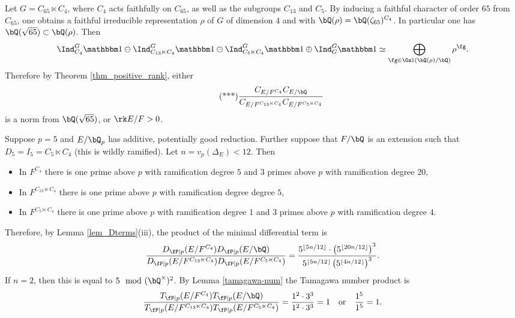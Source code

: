 \begin{example}
Let $G = C_{65} \ltimes C_4$, where $C_4$ acts faithfully on $C_{65}$, as well as the subgroups $C_{13}$ and $C_5$. By inducing a faithful character of order $65$ from $C_{65}$, one obtains a faithful irreducible representation $\rho$ of $G$ of dimension $4$ and with $\bQ(\rho) = \bQ(\zeta_{65})^{C_4}$. In particular one has $\bQ(\sqrt{65}) \subset \bQ(\rho)$. Then
\[ \Ind_{C_4}^G \trivial \ominus \Ind_{C_{13} \ltimes C_4}^G \trivial \ominus \Ind_{C_5 \ltimes C_4}^G \trivial \oplus \Ind_{G}^G \trivial \simeq \bigoplus_{\fg \in \Gal(\bQ(\rho) / \bQ)} \rho^{\fg} .\]
Therefore by Theorem \ref{thm_positive_rank}, either 
\begin{equation}\label{ex3}\tag{***}
\frac{C_{E / F^{C_4}} C_{E / \bQ} }{C_{E / F^{C_{13} \ltimes C_4}} C_{E / F^{C_5 \ltimes C_4}}}
\end{equation}
is a norm from $\bQ(\sqrt{65})$, or $\rk E / F > 0$.  

Suppose $p = 5$ and $E / \bQ_p$ has additive, potentially good reduction. Further suppose that $F / \bQ$ is an extension such that $D_{5} = I_{5} = C_5 \ltimes C_4$ (this is wildly ramified). Let $n = v_p(\Delta_E) < 12$. Then
\begin{itemize}[--]
    \setlength\itemsep{0em}
    \item In $F^{C_4}$ there is one prime above $p$ with ramification degree $5$ and $3$ primes above $p$ with ramification degree $20$,
    \item In $F^{C_{13} \ltimes C_4}$ there is one prime above $p$ with ramification degree degree $5$,
    \item In $F^{C_5 \ltimes C_4}$ there is one prime above $p$ with ramification degree $1$ and $3$ primes above $p$ with ramification degree $4$.
\end{itemize}
Therefore, by Lemma \ref{lem_Dterms}(iii), the product of the minimal differential term is 
\[ \frac{D_{\fP \mid p}(E / F^{C_4}) D_{\fP \mid p}(E / \bQ) }{D_{\fP \mid p}(E / F^{C_{13} \ltimes C_4}) D_{\fP \mid p}(E / F^{C_{5} \ltimes C_4})} = 
\frac{ 5^{\floor{5 n /12}} \cdot \left(5^{\floor{20 n /12}}\right)^3 }{5^{\floor{5 n /12}} \left(5^{\floor{4 n /12}}\right)^3} .\]
If $n = 2$, then this is equal to $5 \mod {(\bQ^{\times})^2}$. By Lemma \ref{tamagawa-num} the Tamagawa number product is
\[ \frac{T_{\fP \mid p}(E / F^{C_4}) T_{\fP \mid p}(E / \bQ) }{T_{\fP \mid p}(E / F^{C_{13} \ltimes C_4}) T_{\fP \mid p}(E / F^{C_{5} \ltimes C_4})} = \frac{1^2 \cdot 3^3 }{1^2 \cdot 3^3} = 1 \quad \text{or} \quad \frac{1^5}{1^5} = 1.\]


\end{example}
